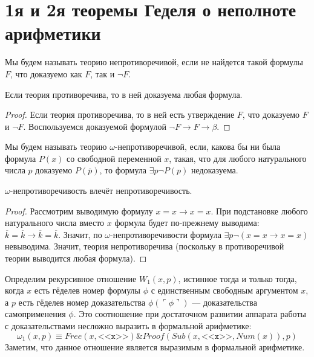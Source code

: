 \section{1я и 2я теоремы Геделя о неполноте арифметики}

\begin{definition}Мы будем называть теорию непротиворечивой, если
не найдется такой формулы $F$, что доказуемо как $F$, так и $\neg F$.
\end{definition}

\begin{lemma}
Если теория противоречива, то в ней доказуема любая формула.
\end{lemma}
\begin{proof}
Если теория противоречива, то в ней есть утверждение $F$, что доказуемо $F$ и $\neg F$.
Воспользуемся доказуемой формулой $\neg F \rightarrow F \rightarrow \beta$.
\end{proof}

\begin{definition}Мы будем называть теорию $\omega$-непротиворечивой,
если, какова бы ни была формула $P(x)$ со свободной переменной $x$, 
такая, что для любого натурального числа $p$ доказуемо $P(\overline{p})$, 
то формула $\exists p \neg P(p)$ недоказуема.
\end{definition}

\begin{lemma}
$\omega$-непротиворечивость влечёт непротиворечивость.
\end{lemma}

\begin{proof}
Рассмотрим выводимую формулу $x=x \rightarrow x=x$.
При подстановке любого натурального числа вместо $x$
формула будет по-прежнему выводима: $\overline{k} = \overline{k} \rightarrow \overline{k}=\overline{k}$.
Значит, по $\omega$-непротиворечивости формула $\exists p \neg (x=x \rightarrow x=x)$ невыводима.
Значит, теория непротиворечива (поскольку в противоречивой теории выводится любая формула).
\end{proof}

Определим рекурсивное отношение $W_1(x,p)$,
истинное тогда и только тогда, когда $x$ есть гёделев номер формулы
$\phi$ с единственным свободным аргументом $x$, а $p$ есть гёделев номер 
доказательства $\phi(\ulcorner\phi\urcorner)$ --- доказательства 
самоприменения $\phi$. 
Это соотношение при достаточном развитии аппарата работы с доказательствами несложно
выразить в формальной арифметике:
$$\omega_1(x,p) \equiv Free(x,\texttt{<<x>>}) \& Proof (Sub(x,\texttt{<<x>>},Num(x)),p)$$
Заметим, что данное отношение является выразимым в формальной арифметике.

